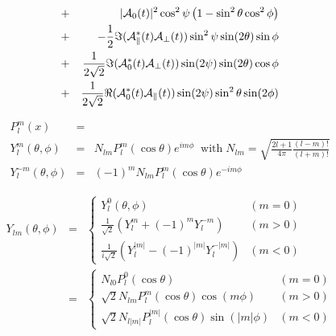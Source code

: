 \documentclass[a4paper,9pt,twoside]{article}
\begin{document}
\begin{eqnarray}
                              &+&   |{\cal A}_0(t)|^2 \cos^2\psi\left( 1  -  \sin^2\theta\cos^2\phi\right) \\
                              &+&     -\frac{1}{2}\Im({\cal A}_\parallel^*(t){\cal A}_\perp(t))\sin^2\psi\sin(2\theta)\sin\phi  \\
                              &+&     \frac{1}{2\sqrt{2}}\Im({\cal A}_0^*(t) {\cal A}_\perp(t) ) \sin(2\psi)\sin(2\theta)\cos\phi \\
                              &+&     \frac{1}{2\sqrt{2}}\Re({\cal A}_0^*(t) {\cal A}_\parallel(t))\sin(2\psi)\sin^2\theta\sin(2\phi)\\
\end{eqnarray}


\begin{eqnarray}
P_l^m(x) &=& \\
Y_l^m (\theta,\phi) &=& N_{lm} P_l^m(\cos\theta)e^{im\phi}\;\;\mathrm{with}\;N_{lm} =\sqrt{ \frac{2l+1}{4\pi}\frac{(l-m)!}{(l+m)!} } \\
Y_l^{-m}(\theta,\phi) &=& (-1)^m N_{lm}P_l^m(\cos\theta) e^{-im\phi}
\end{eqnarray}

\begin{eqnarray}
Y_{lm}(\theta,\phi) & = & \left\{ \begin{array}{cl} 
                                             Y_l^0(\theta,\phi) & (m=0) \\
                                             \frac{1}{\sqrt{2}} \left( Y_l^m + (-1)^m Y_l^{-m}\right)  & (m>0) \\
                                             \frac{1}{i\sqrt{2}}\left( Y_l^{|m|}-(-1)^{|m|}Y_l^{-|m|} \right) & (m<0)
                                  \end{array}\right.\\
                    & = & \left\{ \begin{array}{cl} 
                                             N_{l0} P_l^0(\cos\theta) & (m=0) \\
                                             \sqrt{2}N_{lm}P_l^m(\cos\theta)\cos(m\phi) & (m>0) \\
                                             \sqrt{2}N_{l|m|} P_l^{|m|}(\cos\theta)\sin(|m|\phi)& (m<0)
                                  \end{array}\right.
\end{eqnarray}
\end{document}
